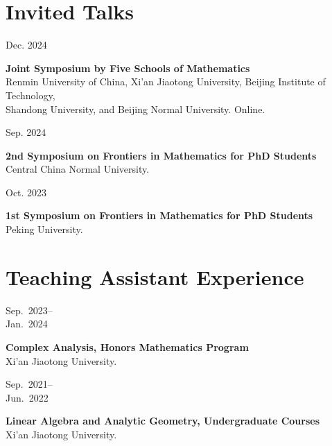 \documentclass[11pt,letterpaper]{article}
\newcommand{\entry}[3]{\Needspace{3\baselineskip}\noindent\begin{minipage}[t]{1.14in}\vspace{0pt}\small\sffamily\color{muted}\raggedright #2\end{minipage}\hfill\begin{minipage}[t]{\dimexpr\textwidth-1.26in\relax}\vspace{0pt}\raggedright\setlength{\parskip}{0pt}\textbf{#1}\\#3\end{minipage}\par\vspace{3pt}}
\let\originalsection\section
\renewcommand{\section}[1]{\Needspace{7\baselineskip}\originalsection{#1}}
\begin{document}
\section{Invited Talks}
\entry{Joint Symposium by Five Schools of Mathematics}{Dec. 2024}{%
Renmin University of China, Xi'an Jiaotong University, Beijing Institute of Technology,\\
Shandong University, and Beijing Normal University. Online.}
\entry{2nd Symposium on Frontiers in Mathematics for PhD Students}{Sep. 2024}{%
Central China Normal University.}
\entry{1st Symposium on Frontiers in Mathematics for PhD Students}{Oct. 2023}{%
Peking University.}

\section{Teaching Assistant Experience}
\entry{Complex Analysis, Honors Mathematics Program}{Sep.~2023--\\Jan.~2024}{%
Xi'an Jiaotong University.}
\entry{Linear Algebra and Analytic Geometry, Undergraduate Courses}{Sep.~2021--\\Jun.~2022}{%
Xi'an Jiaotong University.}
\end{document}
